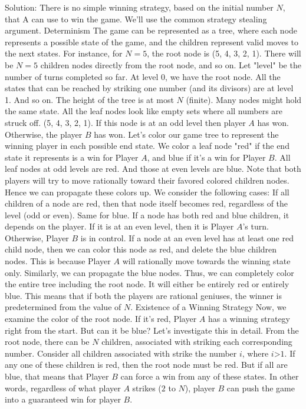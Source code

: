 \begin{enumerate}
Solution: There is no simple winning strategy, based on the initial number $N$, that A can use to win the game. We'll use the common strategy stealing argument.
Determinism
The game can be represented as a tree, where each node represents a possible state of the game, and the children represent valid moves to the next states.
For instance, for $N=5$, the root node is (5, 4, 3, 2, 1). There will be $N=5$ children nodes directly from the root node, and so on.
Let "level" be the number of turns completed so far.
At level $0$, we have the root node. All the states that can be reached by striking one number (and its divisors) are at level 1. And so on.
The height of the tree is at most $N$ (finite).
Many nodes might hold the same state. All the leaf nodes look like empty sets where all numbers are struck off. (5, 4, 3, 2, 1). If this node is at an odd level then player $A$ has won. Otherwise, the player $B$ has won.
Let's color our game tree to represent the winning player in each possible end state. We color a leaf node "red" if the end state it represents is a win for Player $A$, and blue if it's a win for Player $B$. All leaf nodes at odd levels are red. And those at even levels are blue.
Note that both players will try to move rationally toward their favored colored children nodes. Hence we can propagate these colors up.
We consider the following cases:
If all children of a node are red, then that node itself becomes red, regardless of the level (odd or even). Same for blue.
If a node has both red and blue children, it depends on the player. If it is at an even level, then it is Player $A$'s turn. Otherwise, Player $B$ is in control. If a node at an even level has at least one red child node, then we can color this node as red, and delete the blue children nodes. This is because Player $A$ will rationally move towards the winning state only. Similarly, we can propagate the blue nodes.
Thus, we can completely color the entire tree including the root node. It will either be entirely red or entirely blue.
This means that if both the players are rational geniuses, the winner is predetermined from the value of $N$.
Existence of a Winning Strategy
Now, we examine the color of the root node. If it's red, Player $A$ has a winning strategy right from the start. But can it be blue?
Let's investigate this in detail.
From the root node, there can be $N$ children, associated with striking each corresponding number. Consider all children associated with strike the number $i$, where $i$>$1$. If any one of these children is red, then the root node must be red. But if all are blue, that means that Player $B$ can force a win from any of these states. In other words, regardless of what player $A$ strikes ($2$ to $N$), player $B$ can push the game into a guaranteed win for player $B$.

\end{enumerate}
